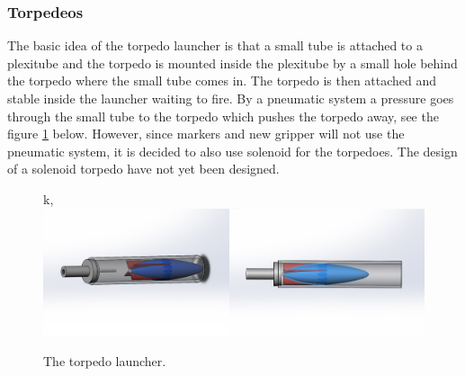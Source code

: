 \subsubsection{Torpedeos}
\label{torpedosection}
The basic idea of the torpedo launcher is that a small tube is attached to a plexitube and the torpedo is mounted inside the plexitube by a small hole behind the torpedo where the small tube comes in. The torpedo is then attached and stable inside the launcher waiting to fire. By a pneumatic system a pressure goes through the small tube to the torpedo which pushes the torpedo away, see the figure \ref{torplunch} below. However, since markers and new gripper will not use the pneumatic system, it is decided to also use solenoid for the torpedoes. The design of a solenoid torpedo have not yet been designed.


	\begin{figure}[!ht]
		\begin{center}k,
			\includegraphics[width=150mm]{./images/mechanics/OverallAssem2.JPG}
			\caption{The torpedo launcher.}
			\label{torplunch}
		\end{center}
	\end{figure}

